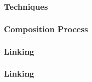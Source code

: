 \documentclass[12pt,twoside,maitrise]{dms}
\theoremstyle{definition}
\begin{document}
\subsubsection{Techniques}

\subsubsection{Composition Process}

\subsubsection{Linking}

\subsubsection{Linking}





\def\bibname{References}
\end{document}
